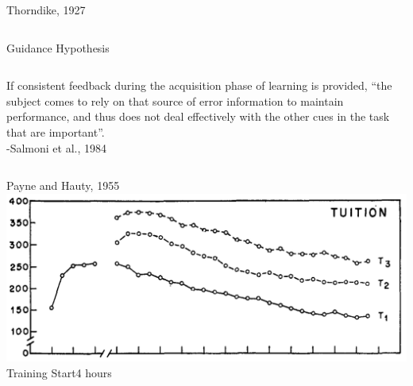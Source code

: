 \documentclass[10pt]{beamer}
\begin{document}
\begin{frame}[fragile]{Thorndike, 1927~\cite{thorndike1927law}}
\begin{columns}[T]
\begin{column}{.4\textwidth}
    \end{column}
  \end{columns}
\end{frame}

\begin{frame}[fragile]{Guidance Hypothesis}
  \begin{columns}[T]
    \begin{column}{.8\textwidth}
        If consistent feedback during the acquisition phase of learning is provided, ``the subject comes to rely on that source of error information to maintain performance, and thus does not deal effectively with the other cues in the task that are important''.\\
        -Salmoni et al., 1984~\cite{salmoni1984knowledge}
    \end{column}
  \end{columns}
\end{frame}


\begin{frame}[fragile]{Payne and Hauty, 1955~\cite{payne1955effect}}
  \includegraphics[width=\textwidth]{../img/payneandhauty.png} \\
  \hspace{3em} Training \hspace{1em} Start\hfill 4 hours
\end{frame}
\end{document}
